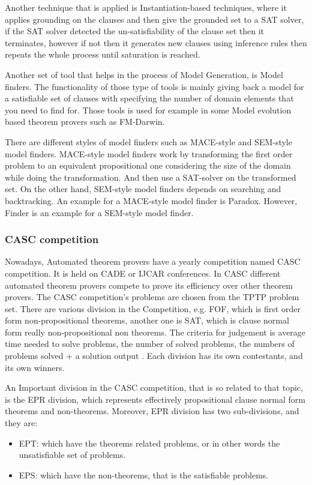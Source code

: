 Another technique that is applied is Instantiation-based techniques, where it applies grounding on the clauses and then give the grounded set to a SAT solver, if the SAT solver detected the un-satisfiability of the clause set then it terminates, however if not then it generates new clauses using inference rules then repeats the whole process until saturation is reached.


Another set of tool that helps in the process of Model Generation, is Model finders. The functionality of those type of tools is mainly giving back a model for a satisfiable set of clauses with specifying the number of domain elements that you need to find for. Those tools is used for example in some Model evolution based theorem provers such as FM-Darwin.


There are different styles of model finders such as MACE-style and SEM-style model finders. MACE-style model finders work by transforming the first order problem to an equivalent propositional one considering the size of the domain while doing the transformation. And then use a SAT-solver on the transformed set. On the other hand, SEM-style model finders depends on searching and backtracking. An example for a MACE-style model finder is Paradox. However, Finder is an example for a SEM-style model finder. \cite{MODEL_FINDER}      


\subsubsection{CASC competition}
Nowadays, Automated theorem provers have a yearly competition named CASC competition. It is held on CADE or IJCAR conferences. In CASC different automated theorem provers compete to prove its efficiency over other theorem provers. The CASC competition's problems are chosen from the TPTP problem set. There are various division in the Competition, e.g. FOF, which is first order form non-propositional theorems, another one is SAT, which is clause normal form really non-propositional non theorems.
The criteria for judgement is average time needed to solve problems, the number of solved problems, the numbers of problems solved + a solution output . Each division has its own contestants, and its own winners.


An Important division in the CASC competition, that is so related to that topic, is the EPR division, which represents effectively propositional clause normal form theorems and non-theorems. Moreover, EPR division has two sub-divisions, and they are:
	\begin{itemize}
		\item EPT: which have the theorems related problems, or in other words the unsatisfiable set of problems.
		\item EPS: which have the non-theorems, that is the satisfiable problems.
	\end{itemize}
	

